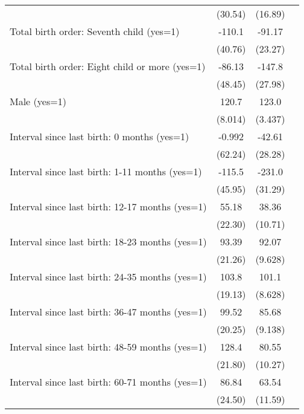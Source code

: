 \begin{tabular}{l*{3}{c}}
                    &     (30.54)&     (16.89)&            \\
[1em]
Total birth order: Seventh child (yes=1)&      -110.1&      -91.17&            \\
                    &     (40.76)&     (23.27)&            \\
[1em]
Total birth order: Eight child or more (yes=1)&      -86.13&      -147.8&            \\
                    &     (48.45)&     (27.98)&            \\
[1em]
Male (yes=1)        &       120.7&       123.0&            \\
                    &     (8.014)&     (3.437)&            \\
[1em]
Interval since last birth: 0 months (yes=1)&      -0.992&      -42.61&            \\
                    &     (62.24)&     (28.28)&            \\
[1em]
Interval since last birth: 1-11 months (yes=1)&      -115.5&      -231.0&            \\
                    &     (45.95)&     (31.29)&            \\
[1em]
Interval since last birth: 12-17 months (yes=1)&       55.18&       38.36&            \\
                    &     (22.30)&     (10.71)&            \\
[1em]
Interval since last birth: 18-23 months (yes=1)&       93.39&       92.07&            \\
                    &     (21.26)&     (9.628)&            \\
[1em]
Interval since last birth: 24-35 months (yes=1)&       103.8&       101.1&            \\
                    &     (19.13)&     (8.628)&            \\
[1em]
Interval since last birth: 36-47 months (yes=1)&       99.52&       85.68&            \\
                    &     (20.25)&     (9.138)&            \\
[1em]
Interval since last birth: 48-59 months (yes=1)&       128.4&       80.55&            \\
                    &     (21.80)&     (10.27)&            \\
[1em]
Interval since last birth: 60-71 months (yes=1)&       86.84&       63.54&            \\
                    &     (24.50)&     (11.59)&            \\

\end{tabular}
